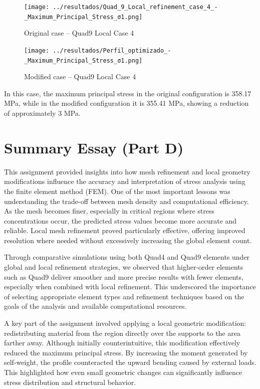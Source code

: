 \documentclass[12pt]{article}
\begin{document}
\begin{figure}[H]
    \centering
    \begin{minipage}{0.48\textwidth}
        \centering
        \texttt{[image: ../resultados/Quad\_9\_Local\_refinement\_case\_4\_-\_Maximum\_Principal\_Stress\_σ1.png]}
        \caption{Original case – Quad9 Local Case 4}
        \label{fig:quad9_local4_original}
    \end{minipage}
    \hfill
    \begin{minipage}{0.48\textwidth}
        \centering
        \texttt{[image: ../resultados/Perfil\_optimizado\_-\_Maximum\_Principal\_Stress\_σ1.png]}
        \caption{Modified case – Quad9 Local Case 4}
        \label{fig:quad9_local4_modified}
    \end{minipage}
\end{figure}

In this case, the maximum principal stress in the original configuration is 358.17 MPa, while in the modified configuration it is 355.41 MPa, showing a reduction of approximately 3 MPa.



\newpage
\section{Summary Essay (Part D)}

This assignment provided insights into how mesh refinement and local geometry modifications influence the accuracy and interpretation of stress analysis using the finite element method (FEM). One of the most important lessons was understanding the trade-off between mesh density and computational efficiency. As the mesh becomes finer, especially in critical regions where stress concentrations occur, the predicted stress values become more accurate and reliable. Local mesh refinement proved particularly effective, offering improved resolution where needed without excessively increasing the global element count.

Through comparative simulations using both Quad4 and Quad9 elements under global and local refinement strategies, we observed that higher-order elements such as Quad9 deliver smoother and more precise results with fewer elements, especially when combined with local refinement. This underscored the importance of selecting appropriate element types and refinement techniques based on the goals of the analysis and available computational resources.

A key part of the assignment involved applying a local geometric modification: redistributing material from the region directly over the supports to the area farther away. Although initially counterintuitive, this modification effectively reduced the maximum principal stress. By increasing the moment generated by self-weight, the profile counteracted the upward bending caused by external loads. This highlighted how even small geometric changes can significantly influence stress distribution and structural behavior.
\end{document}
